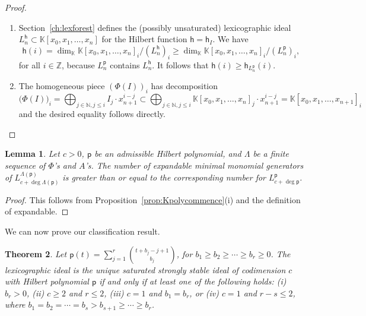 \documentclass[12pt]{amsart}%
\newtheorem{theorem}{Theorem}[section]
\newtheorem{lemma}[theorem]{Lemma}
\theoremstyle{definition}%
\newcommand{\hf}{\mathsf{h}}%
\newcommand{\hp}{\mathsf{p}}%
\newcommand{\lift}{\Phi}%
\newcommand{\plus}{A}%
\newcommand{\kk}{\mathbb{K}}%
\newcommand{\NN}{\mathbb{N}}%
\newcommand{\ZZ}{\mathbb{Z}}%
\begin{document}
\begin{proof} $\;$
  \begin{enumerate}
  \item Section~\ref{ch:lexforest} defines the (possibly unsaturated)
    lexicographic ideal $L^{\hf}_n \subset \kk[x_0, x_1, \dotsc, x_n]$
    for the Hilbert function $\hf = \hf_I$.  We have
    \[
    \hf(i) = \dim_{\kk} \kk[x_0, x_1, \dotsc, x_n]_i / (L^{\hf}_n)_i
    \ge \dim_{\kk} \kk[x_0, x_1, \dotsc, x_n]_i / (L^{\hp}_n)_i,
    \]
    for all $i \in \ZZ$, because $L^{\hp}_n$ contains $L^{\hf}_n$.  It
    follows that $\hf(i) \ge \hf_{L^{\hp}_n}(i)$.

  \item The homogeneous piece $\left( \lift ( I ) \right)_i$ has
    decomposition
    \[
    \bigl( \lift ( I ) \bigr)_i = \bigoplus_{j \in \NN, j \le i} I_j
    \cdot x_{n+1}^{i - j} \subset \bigoplus_{j \in \NN, j \le i}
    \kk[x_0, x_1, \dotsc, x_n]_j \cdot x_{n+1}^{i - j} = \kk[x_0, x_1,
      \dotsc, x_{n+1}]_i
    \]
    and the desired equality follows directly.  \qedhere
  \end{enumerate}
\end{proof}

\begin{lemma}
  \label{lem:expandablegens}
  Let $c > 0$, $\hp$ be an admissible Hilbert polynomial, and
  $\Lambda$ be a finite sequence of $\lift$'s and $\plus$'s.  The
  number of expandable minimal monomial generators of $L^{\Lambda
    (\hp)}_{c + \deg \Lambda (\hp)}$ is greater than or equal to the
  corresponding number for $L^{\hp}_{c + \deg \hp}$.
\end{lemma}

\begin{proof}
  This follows from Proposition~\ref{prop:Kpolycommence}(i) and the
  definition of expandable.
\end{proof}

We can now prove our classification result.

\begin{theorem}
  \label{thm:SSSunique2}
  Let $\hp(t) = \sum_{j=1}^r \binom{t + b_j - j+1}{b_j}$, for $b_1 \ge
  b_2 \ge \dotsb \ge b_r \ge 0$.  The lexicographic ideal is the
  unique saturated strongly stable ideal of codimension $c$ with
  Hilbert polynomial $\hp$ if and only if at least one of the
  following holds: (i) $b_r > 0$, (ii) $c \ge 2$ and $r \le 2$, (iii)
  $c = 1$ and $b_1 = b_r$, or (iv) $c = 1$ and $r - s \le 2$, where
  $b_1 = b_2 = \dotsb = b_{s} > b_{s+1} \ge \dotsb \ge b_r$.
\end{theorem}
\end{document}

